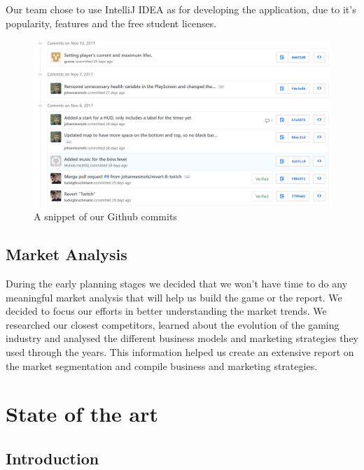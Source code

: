 \documentclass[12p]{article}
\begin{document}
Our team chose to use IntelliJ IDEA as for developing the application, due to it's popularity, features and the free student licenses.

\begin{figure}[ht]
  \center
  \includegraphics[width=1\textwidth]{Methodology/github.png}
  \caption{A snippet of our Github commits}
\end{figure}

\subsection{Market Analysis}
During the early planning stages we decided that we won't have time to do any meaningful market analysis that will help us build the game or the report. We decided to focus our efforts in better understanding the market trends. We researched our closest competitors, learned about the evolution of the gaming industry and analysed the different business models and marketing strategies they used through the years. This information helped us create an extensive report on the market segmentation and compile business and marketing strategies.   

\newpage
\section{State of the art}
\subsection{Introduction}
\end{document}
